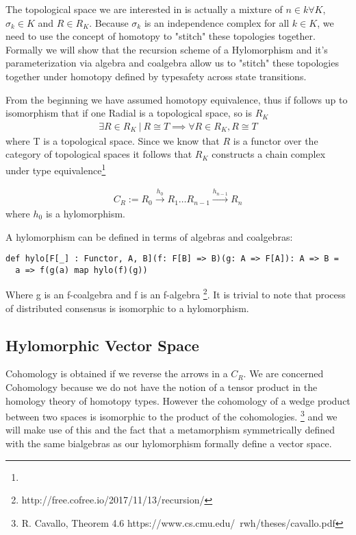 \documentclass{article}
\begin{document}
The topological space we are interested in is actually a mixture of $n \in k \forall K$, $\sigma_k \in K$ and $R \in R_K$. Because $\sigma_k$ is an independence complex for all $k \in K$, we need to use the concept of homotopy to "stitch" these topologies together. Formally we will show that the recursion scheme of a Hylomorphism and it's parameterization via algebra and coalgebra allow us to "stitch" these topologies together under homotopy defined by typesafety across state transitions.

From the beginning we have assumed homotopy equivalence, thus if follows up to isomorphism that if one Radial is a topological space, so is $R_K$
\begin{equation} \label{eq1}
\begin{split}
\exists R \in R_K \ | \ R \cong T \implies \forall R \in R_K,  R \cong T
\end{split}
\end{equation}
where T is a topological space. Since we know that $R$ is a functor over the category of topological spaces it follows that $R_K$ constructs a chain complex under type equivalence\footnote{}

\begin{equation} \label{eq1}
\begin{split}
C_R := R_{0}{\xrightarrow {h_{0}}}R_{1} \dots R_{n-1}{\xrightarrow {h_{n-1}}}R_{n}
\end{split}
\end{equation}
where $h_{0}$ is a hylomorphism.

A hylomorphism can be defined in terms of algebras and coalgebras:
\begin{lstlisting}
def hylo[F[_] : Functor, A, B](f: F[B] => B)(g: A => F[A]): A => B =
  a => f(g(a) map hylo(f)(g))
\end{lstlisting}
Where g is an f-coalgebra and f is an f-algebra \footnote{http://free.cofree.io/2017/11/13/recursion/}. It is trivial to note that process of distributed consensus is isomorphic to a hylomorphism. 

\subsection{Hylomorphic Vector Space}
Cohomology is obtained if we reverse the arrows in a $C_R$. We are concerned Cohomology because we do not have the notion of a tensor product in the homology theory of homotopy types. However the cohomology of a wedge product between two spaces is isomorphic to the product of the cohomologies. \footnote{R. Cavallo, Theorem 4.6 https://www.cs.cmu.edu/~rwh/theses/cavallo.pdf} and we will make use of this and the fact that a metamorphism symmetrically defined with the same bialgebras as our hylomorphism formally define a vector space.
\end{document}
